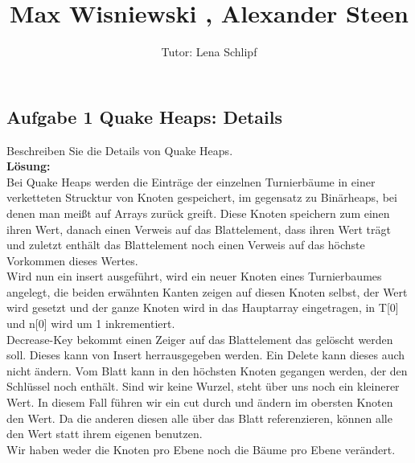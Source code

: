 \documentclass[11pt,a4paper,ngerman]{article}
\author{Tutor: Lena Schlipf}
\date{}
\title{Max Wisniewski , Alexander Steen}
\begin{document}

\maketitle
\thispagestyle{fancy}

\subsection*{Aufgabe 1 \mdseries Quake Heaps: Details}

Beschreiben Sie die Details von Quake Heaps.\\

\textbf{Lösung:}\\

Bei Quake Heaps werden die Einträge der einzelnen Turnierbäume in einer verketteten Strucktur von Knoten gespeichert, im gegensatz zu Binärheaps, bei denen man meißt auf Arrays zurück greift. Diese Knoten speichern zum einen ihren Wert, danach einen Verweis auf das Blattelement, dass ihren Wert trägt und zuletzt enthält das Blattelement noch einen Verweis auf das höchste Vorkommen dieses Wertes.\\

Wird nun ein insert ausgeführt, wird ein neuer Knoten eines Turnierbaumes angelegt, die beiden erwähnten Kanten zeigen auf diesen Knoten selbst, der Wert wird gesetzt und der ganze Knoten wird in das Hauptarray eingetragen, in T[0] und n[0] wird um 1 inkrementiert.\\

Decrease-Key bekommt einen Zeiger auf das Blattelement das gelöscht werden soll. Dieses kann von Insert herrausgegeben werden. Ein Delete kann dieses auch nicht ändern. Vom Blatt kann in den höchsten Knoten gegangen werden, der den Schlüssel noch enthält. Sind wir keine Wurzel, steht über uns noch ein kleinerer Wert. In diesem Fall führen wir ein cut durch und ändern im obersten Knoten den Wert. Da die anderen diesen alle über das Blatt referenzieren, können alle den Wert statt ihrem eigenen benutzen.\\
Wir haben weder die Knoten pro Ebene noch die Bäume pro Ebene verändert.\\
\end{document}
